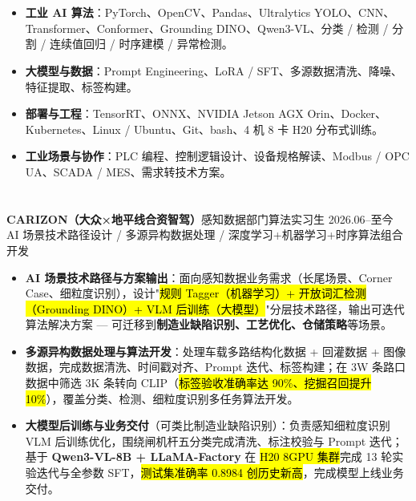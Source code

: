 \section[专业技能]{}
\begin{itemize}
    \item \textbf{工业 AI 算法}：PyTorch、OpenCV、Pandas、Ultralytics YOLO、CNN、Transformer、Conformer、Grounding DINO、Qwen3-VL、分类 / 检测 / 分割 / 连续值回归 / 时序建模 / 异常检测。
    \item \textbf{大模型与数据}：Prompt Engineering、LoRA / SFT、多源数据清洗、降噪、特征提取、标签构建。
    \item \textbf{部署与工程}：TensorRT、ONNX、NVIDIA Jetson AGX Orin、Docker、Kubernetes、Linux / Ubuntu、Git、bash、4 机 8 卡 H20 分布式训练。
    \item \textbf{工业场景与协作}：PLC 编程、控制逻辑设计、设备规格解读、Modbus / OPC UA、SCADA / MES、需求转技术方案。
\end{itemize}

\section[实习经历]{}
{\small\textbf{CARIZON（大众×地平线合资智驾）}}\quad 感知数据部门算法实习生 \hfill {2026.06--至今}\\
{\scriptsize\color{WHU_Blue} AI 场景技术路径设计 / 多源异构数据处理 / 深度学习+机器学习+时序算法组合开发}
\begin{itemize}
    \item \textbf{AI 场景技术路径与方案输出}：面向感知数据业务需求（长尾场景、Corner Case、细粒度识别），设计"\hl{规则 Tagger（机器学习）+ 开放词汇检测（Grounding DINO）+ VLM 后训练（大模型）}"分层技术路径，输出可迭代算法解决方案 — 可迁移到\textbf{制造业缺陷识别、工艺优化、仓储策略}等场景。
    \item \textbf{多源异构数据处理与算法开发}：处理车载多路结构化数据 + 回灌数据 + 图像数据，完成数据清洗、时间戳对齐、Prompt 迭代、标签构建；在 3W 条路口数据中筛选 3K 条转向 CLIP（\hl{标签验收准确率达 90\%、挖掘召回提升 10\%}），覆盖分类、检测、细粒度识别多任务算法开发。
    \item \textbf{大模型后训练与业务交付}（可类比制造业缺陷识别）：负责感知细粒度识别 VLM 后训练优化，围绕闸机杆五分类完成清洗、标注校验与 Prompt 迭代；基于 \textbf{Qwen3-VL-8B + LLaMA-Factory} 在 \hl{H20 8GPU 集群}完成 13 轮实验迭代与全参数 SFT，\hl{测试集准确率 0.8984 创历史新高}，完成模型上线业务交付。
\end{itemize}

